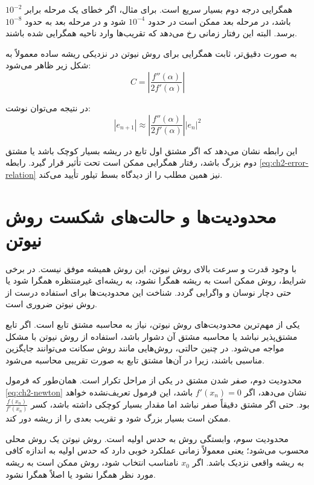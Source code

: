 همگرایی درجه دوم بسیار سریع است. برای مثال، اگر خطای یک مرحله برابر $10^{-2}$ باشد، در مرحله بعد ممکن است در حدود $10^{-4}$ شود و در مرحله بعد به حدود $10^{-8}$ برسد. البته این رفتار زمانی رخ می‌دهد که تقریب‌ها وارد ناحیه همگرایی شده باشند.

به صورت دقیق‌تر، ثابت همگرایی برای روش نیوتن در نزدیکی ریشه ساده معمولاً به شکل زیر ظاهر می‌شود:
\begin{equation}
C=\left|\frac{f''(\alpha)}{2f'(\alpha)}\right|
\label{eq:ch2-conv-constant}
\end{equation}

در نتیجه می‌توان نوشت:
\begin{equation}
|e_{n+1}| \approx 
\left|\frac{f''(\alpha)}{2f'(\alpha)}\right|
|e_n|^2
\label{eq:ch2-error-approx}
\end{equation}

این رابطه نشان می‌دهد که اگر مشتق اول تابع در ریشه بسیار کوچک باشد یا مشتق دوم بزرگ باشد، رفتار همگرایی ممکن است تحت تأثیر قرار گیرد. رابطه \eqref{eq:ch2-error-relation} نیز همین مطلب را از دیدگاه بسط تیلور تأیید می‌کند.

\section{محدودیت‌ها و حالت‌های شکست روش نیوتن}

با وجود قدرت و سرعت بالای روش نیوتن، این روش همیشه موفق نیست. در برخی شرایط، روش ممکن است به ریشه همگرا نشود، به ریشه‌ای غیرمنتظره همگرا شود یا حتی دچار نوسان و واگرایی گردد. شناخت این محدودیت‌ها برای استفاده درست از روش نیوتن ضروری است.

یکی از مهم‌ترین محدودیت‌های روش نیوتن، نیاز به محاسبه مشتق تابع است. اگر تابع مشتق‌پذیر نباشد یا محاسبه مشتق آن دشوار باشد، استفاده از روش نیوتن با مشکل مواجه می‌شود. در چنین حالتی، روش‌هایی مانند روش سکانت می‌توانند جایگزین مناسبی باشند، زیرا در آن‌ها مشتق تابع به صورت تقریبی محاسبه می‌شود.

محدودیت دوم، صفر شدن مشتق در یکی از مراحل تکرار است. همان‌طور که فرمول \eqref{eq:ch2-newton} نشان می‌دهد، اگر $f'(x_n)=0$ باشد، این فرمول تعریف‌نشده خواهد بود. حتی اگر مشتق دقیقاً صفر نباشد اما مقدار بسیار کوچکی داشته باشد، کسر $\frac{f(x_n)}{f'(x_n)}$ ممکن است بسیار بزرگ شود و تقریب بعدی را از ریشه دور کند.

محدودیت سوم، وابستگی روش به حدس اولیه است. روش نیوتن یک روش محلی محسوب می‌شود؛ یعنی معمولاً زمانی عملکرد خوبی دارد که حدس اولیه به اندازه کافی به ریشه واقعی نزدیک باشد. اگر $x_0$ نامناسب انتخاب شود، روش ممکن است به ریشه مورد نظر همگرا نشود یا اصلاً همگرا نشود.


